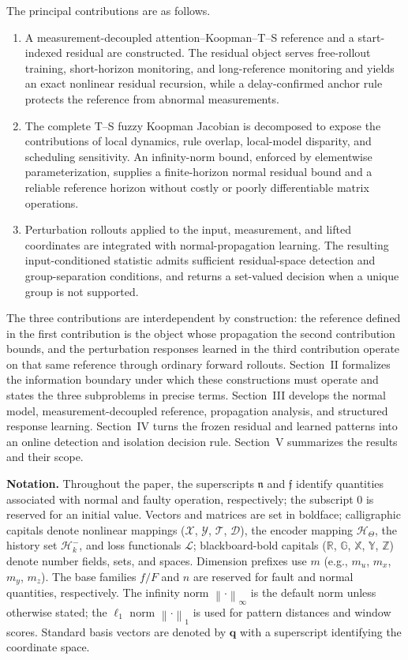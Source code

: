 \documentclass[journal]{IEEEtran}
\newcommand{\norm}[1]{\left\lVert #1\right\rVert}
\newcommand{\1}{\bm 1}
\begin{document}
The principal contributions are as follows.
\begin{enumerate}
\item A measurement-decoupled attention--Koopman--T--S reference and a
start-indexed residual are constructed. The residual object serves
free-rollout training, short-horizon monitoring, and long-reference
monitoring and yields an exact nonlinear residual recursion, while a
delay-confirmed anchor rule protects the reference from abnormal
measurements.

\item The complete T--S fuzzy Koopman Jacobian is decomposed to expose the
contributions of local dynamics, rule overlap, local-model disparity, and
scheduling sensitivity. An infinity-norm bound, enforced by elementwise
parameterization, supplies a finite-horizon normal residual bound and a
reliable reference horizon without costly or poorly differentiable matrix
operations.

\item Perturbation rollouts applied to the input, measurement, and lifted
coordinates are integrated with normal-propagation learning. The resulting
input-conditioned statistic admits sufficient residual-space detection and
group-separation conditions, and returns a set-valued decision when a unique
group is not supported.
\end{enumerate}

The three contributions are interdependent by construction: the reference
defined in the first contribution is the object whose propagation the second
contribution bounds, and the perturbation responses learned in the third
contribution operate on that same reference through ordinary forward rollouts.
Section~II formalizes the information boundary under which these constructions
must operate and states the three subproblems in precise terms. Section~III
develops the normal model, measurement-decoupled reference, propagation
analysis, and structured response learning. Section~IV turns the frozen
residual and learned patterns into an online detection and isolation decision
rule. Section~V summarizes the results and their scope.

\textbf{Notation.} Throughout the paper, the superscripts $\mathfrak n$ and
$\mathfrak f$ identify quantities associated with normal and faulty operation,
respectively; the subscript $0$ is reserved for an initial value. Vectors and
matrices are set in boldface; calligraphic capitals denote nonlinear mappings
($\mathcal X$, $\mathcal Y$, $\mathcal T$, $\mathcal D$), the encoder mapping
$\mathcal H_\Theta$, the history set $\mathcal H_k^-$, and loss functionals
$\mathcal L$; blackboard-bold capitals ($\mathbb R$, $\mathbb G$, $\mathbb X$,
$\mathbb Y$, $\mathbb Z$) denote number fields, sets, and spaces. Dimension prefixes use
$m$ (e.g., $m_u$, $m_x$, $m_y$, $m_z$). The base families $f/F$ and $n$ are
reserved for fault and normal quantities, respectively. The infinity norm
$\norm{\cdot}_\infty$ is the default norm unless otherwise stated; the
$\ell_1$ norm $\norm{\cdot}_1$ is used for pattern distances and window
scores. Standard basis vectors are denoted by $\bm q$ with a superscript
identifying the coordinate space.
\end{document}
